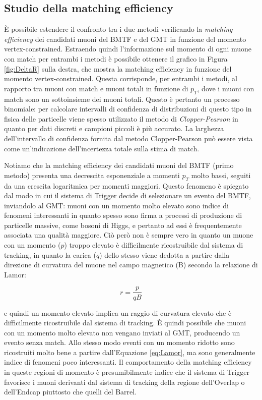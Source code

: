 \subsection{Studio della matching efficiency}
\label{sec:MatchingEfficiency}

È possibile estendere il confronto tra i due metodi verificando la \textit{matching efficiency} dei candidati muoni del BMTF e del GMT in funzione del momento vertex-constrained. Estraendo quindi l'informazione sul momento di ogni muone con match per entrambi i metodi è possibile ottenere il grafico in Figura \ref{fig:DeltaR} sulla destra, che mostra la matching efficiency in funzione del momento vertex-constrained. 
Questa corrisponde, per entrambi i metodi, al rapporto tra muoni con match e muoni totali in funzione di $p_T$, dove i muoni con match sono un sottoinsieme dei muoni totali. Questo è pertanto un processo binomiale: per calcolare intervalli di confidenza di distribuzioni di questo tipo in fisica delle particelle viene spesso utilizzato il metodo di \textit{Clopper-Pearson} in quanto per dati discreti e campioni piccoli è più accurato. La larghezza dell’intervallo di confidenza fornita dal metodo Clopper-Pearson può essere vista come un’indicazione dell’incertezza totale sulla stima di match.


Notiamo che la matching efficiency dei candidati muoni del BMTF (primo metodo) presenta una decrescita esponenziale a momenti $p_T$ molto bassi, seguiti da una crescita logaritmica per momenti maggiori. Questo fenomeno è spiegato dal modo in cui il sistema di Trigger decide di selezionare un evento del BMTF, inviandolo al GMT: muoni con un momento molto elevato sono indice di fenomeni interessanti in quanto spesso sono firma a processi di produzione di particelle massive, come bosoni di Higgs, e pertanto ad essi è frequentemente associata una qualità maggiore. Ciò però non è sempre vero in quanto un muone con un momento ($p$) troppo elevato è difficilmente ricostruibile dal sistema di tracking, in quanto la carica ($q$) dello stesso viene dedotta a partire dalla direzione di curvatura del muone nel campo magnetico (B) secondo la relazione di Lamor:

\begin{equation}
  \label{eq:Lamor}
  r = \frac{p}{qB}
\end{equation}

e quindi un momento elevato implica un raggio di curvatura elevato che è difficilmente ricostruibile dal sistema di tracking. È quindi possibile che muoni con un momento molto elevato non vengano inviati al GMT, producendo un evento senza match.  
Allo stesso modo eventi con un momento ridotto sono ricostruiti molto bene a partire dall'Equazione \ref{eq:Lamor}, ma sono generalmente indice di fenomeni poco interessanti. Il comportamento della matching efficiency in queste regioni di momento è presumibilmente indice che il sistema di Trigger favorisce i muoni derivanti dal sistema di tracking della regione dell'Overlap o dell'Endcap piuttosto che quelli del Barrel.

